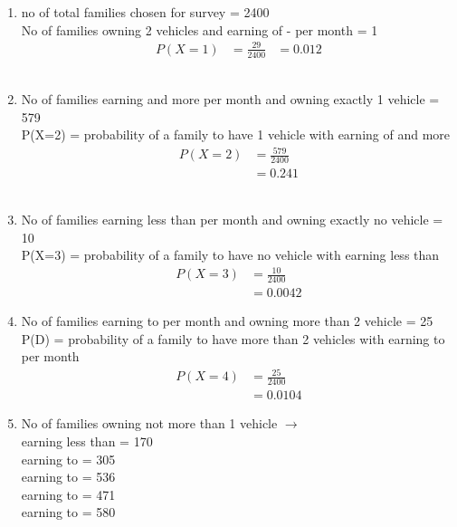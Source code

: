 \renewcommand{\theequation}{\theenumi}
\begin{enumerate}[label=\arabic*.,ref=\thesubsection.\theenumi]
\item no of total families chosen for survey = 2400
\\
No of families owning 2 vehicles and earning of  -  per month = 1
\begin{align}
P\left(X=1\right) &= \frac{29}{2400}
&= 0.012
\end{align}
\\
\item No of families earning  and more per month and owning exactly 1 vehicle = 579
\\
P(X=2) = probability of a family to have 1 vehicle with earning of  and more 
\begin{align}
P\left(X=2\right) &= \frac{579}{2400}
\\
&= 0.241
\end{align}
\\
\item No of families earning  less than   per month and owning exactly no vehicle = 10
\\
P(X=3) = probability of a family to have no vehicle with earning less than   
\begin{align}
P\left(X=3\right) &= \frac{10}{2400}
\\
&= 0.0042
\end{align}
\item No of families earning     to   per month and owning more than 2 vehicle = 25
\\
P(D) = probability of a family to have more than 2 vehicles with earning  to  per month   
\begin{align}
P\left(X=4\right) &= \frac{25}{2400}
\\
&= 0.0104
\end{align}
\item No of families owning not  more than 1 vehicle $\to$
\\
earning less than  = 170
\\
earning  to  = 305
\\
earning  to  = 536
\\
earning  to  = 471
\\
earning  to  = 580
\\

\end{enumerate}
